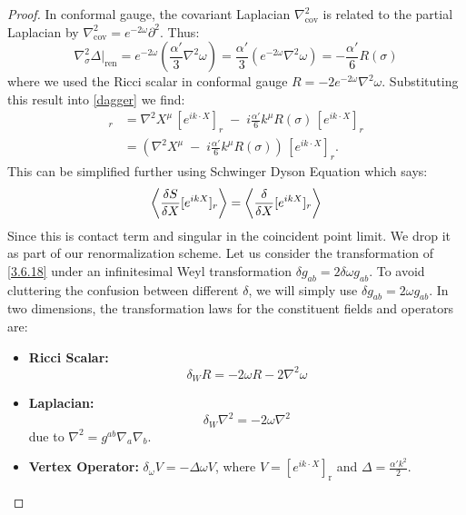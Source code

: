 \begin{tcolorbox}[breakable]
\begin{proof}
			In conformal gauge, the covariant Laplacian $\nabla^2_{\text{cov}}$ is related to the partial Laplacian by $\nabla^2_{\text{cov}} = e^{-2\omega} \partial^2$. Thus:
			\begin{equation}
				\nabla^2_\sigma \Delta \Big|_{\text{ren}} = e^{-2\omega} \left( \frac{\alpha'}{3} \nabla^2 \omega \right) = \frac{\alpha'}{3} (e^{-2\omega} \nabla^2 \omega)=-\frac{\alpha'}{6} R(\sigma)\label{13}
			\end{equation}
			where we used the Ricci scalar in conformal gauge $R = -2 e^{-2\omega} \nabla^2 \omega$. Substituting this result into \eqref{dagger} we find:
			\begin{align}
				[\nabla^2 X^\mu e^{ik\cdot X}]_r &= \nabla^2 X^\mu \,[e^{ik\cdot X}]_r \;-\; i\frac{\alpha'}{6} k^\mu R(\sigma)\,[e^{ik\cdot X}]_r\\
				&=\left(\nabla^2 X^\mu \;-\; i\frac{\alpha'}{6} k^\mu R(\sigma)\right)\,[e^{ik\cdot X}]_r.
				\label{ddagger}
			\end{align}
			This can be simplified further using Schwinger Dyson Equation which says:
			\begin{equation}
				\ev{\frac{\delta S}{\delta X}[e^{ikX}]_r}=\ev{\frac{\delta}{\delta X}[e^{ikX}]_r}
			\end{equation}
			Since this is contact term and singular in the coincident point limit. We drop it as part of our renormalization scheme.	Let us consider the transformation of \eqref{3.6.18} under an infinitesimal Weyl transformation $\delta g_{ab} = 2\delta\omega g_{ab}$. To avoid cluttering the confusion between different $\delta$, we will simply use $\delta g_{ab} = 2\omega g_{ab}$. In two dimensions, the transformation laws for the constituent fields and operators are:
			\begin{itemize}
				\item \textbf{Ricci Scalar:} 
				\begin{equation}
					\delta_W R = -2\omega R - 2\nabla^2 \omega\label{16}
				\end{equation}
				\item \textbf{Laplacian:} 
				\begin{equation}
					\delta_W \nabla^2 = -2\omega \nabla^2\label{17}
				\end{equation}
				due to $\nabla^2 = g^{ab}\nabla_a \nabla_b$.
				\item \textbf{Vertex Operator:} $\delta_\omega V = -\Delta \omega V$, where $V = [e^{ik\cdot X}]_{\text{r}}$ and $\Delta = \frac{\alpha' k^2}{2}$.
			\end{itemize}
			

\end{proof}
\end{tcolorbox}
